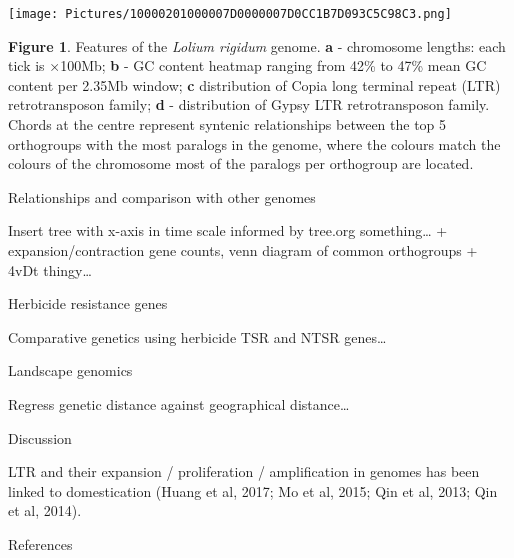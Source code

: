 \texttt{[image: Pictures/10000201000007D0000007D0CC1B7D093C5C98C3.png]}

\textbf{Figure 1}. Features of the \emph{Lolium rigidum} genome.
\textbf{a} - chromosome lengths: each tick is ×100Mb; \textbf{b} - GC
content heatmap ranging from 42\% to 47\% mean GC content per 2.35Mb
window; \textbf{c} distribution of Copia long terminal repeat (LTR)
retrotransposon family; \textbf{d} - distribution of Gypsy LTR
retrotransposon family. Chords at the centre represent syntenic
relationships between the top 5 orthogroups with the most paralogs in
the genome, where the colours match the colours of the chromosome most
of the paralogs per orthogroup are located.

\protect\hypertarget{anchor-16}{}{}Relationships and comparison with
other genomes

Insert tree with x-axis in time scale informed by tree.org
something\ldots{} + expansion/contraction gene counts, venn diagram of
common orthogroups + 4vDt thingy\ldots{}

\protect\hypertarget{anchor-17}{}{}Herbicide resistance genes

Comparative genetics using herbicide TSR and NTSR genes\ldots{}

\protect\hypertarget{anchor-18}{}{}Landscape genomics

Regress genetic distance against geographical distance\ldots{}

\protect\hypertarget{anchor-19}{}{}

\protect\hypertarget{anchor-20}{}{}Discussion

LTR and their expansion / proliferation / amplification in genomes has
been linked to domestication (Huang et al, 2017; Mo et al, 2015; Qin et
al, 2013; Qin et al, 2014).

\protect\hypertarget{anchor-21}{}{}References
